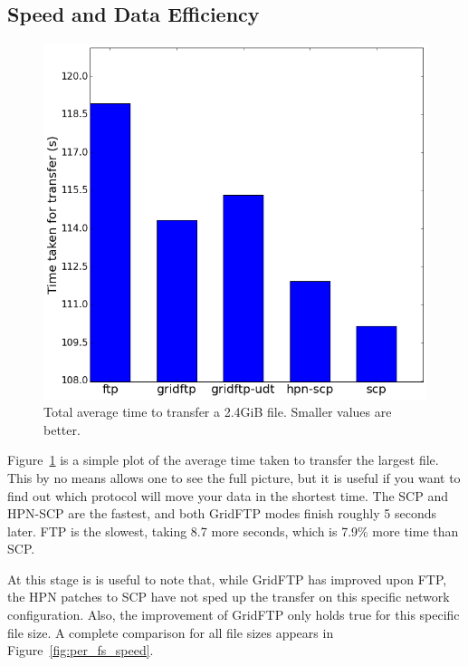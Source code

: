 \documentclass{sig-alternate-05-2015}
\begin{document}
\subsection{Speed and Data Efficiency}
\begin{figure}
\centering
	\includegraphics[width=.8\linewidth]{img/time.png}
\caption{Total average time to transfer a 2.4GiB file. Smaller values are better.}
\label{fig:time}
\end{figure}

Figure~\ref{fig:time} is a simple plot of the average time taken to transfer the largest file. This by no means allows one to see the full picture, but it is useful if you want to find out which protocol will move your data in the shortest time. The SCP and HPN-SCP are the fastest, and both GridFTP modes finish roughly 5 seconds later. FTP is the slowest, taking 8.7 more seconds, which is 7.9\% more time than SCP.

At this stage is is useful to note that, while GridFTP has improved upon FTP, the HPN patches to SCP have not sped up the transfer on this specific network configuration. Also, the improvement of GridFTP only holds true for this specific file size. A complete comparison for all file sizes appears in Figure~\ref{fig:per_fs_speed}.
\end{document}
